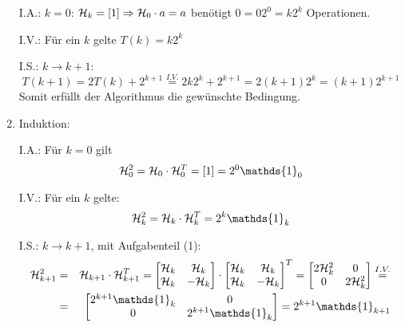 \begin{enumerate}[1.]
	I.A.: $k = 0$: $\mathcal{H}_k = [1] \Rightarrow \mathcal{H}_0 \cdot a = a$ benötigt $0 = 0 2^0 = k 2^k$ Operationen.

	I.V.: Für ein $k$ gelte $T(k) = k 2^k$

	I.S.: $k \rightarrow k + 1$:
	\[T(k+1) = 2 T(k) + 2^{k+1} \overset{I.V.}{=} 2 k 2^k + 2^{k+1} = 2 (k+1)2^k = (k+1) 2^{k+1} \]
	Somit erfüllt der Algorithmus die gewünschte Bedingung.

	\item Induktion:
	
	I.A.: Für $k = 0$ gilt 
	\[ \H_0^2 = \H_0 \cdot \H_0^T = [1] = 2^0 \mathds{1}_0\]
	
	I.V.: Für ein $k$ gelte:
	\[ \H_k^2 = \H_k \cdot \H_k^T = 2^k \mathds{1}_k \]

	I.S.: $k \rightarrow k + 1$, mit Aufgabenteil (1):
	\begin{eqnarray*}
	\H_{k+1}^2 &=& \H_{k+1} \cdot \H_{k+1}^T = \begin{bmatrix}
		\H_k & \H_k \\
		\H_k & -\H_k \\
	\end{bmatrix} \cdot \begin{bmatrix}
		\H_k & \H_k \\
		\H_k & -\H_k \\
	\end{bmatrix}^T =
	\begin{bmatrix}
		2 \H_k^2 & 0 \\
		0 & 2 \H_k^2
	\end{bmatrix} \overset{I.V.}{=} \\
	&=&
	\begin{bmatrix}
		2^{k+1} \mathds{1}_k & 0 \\
		0 & 2^{k+1}\mathds{1}_k \\
	\end{bmatrix} = 
	2^{k+1} \mathds{1}_{k+1}
	\end{eqnarray*}

\end{enumerate}
